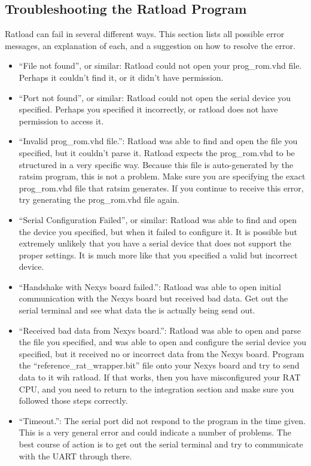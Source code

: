 \documentclass[notitlepage]{article}
\begin{document}
\subsection{Troubleshooting the Ratload Program}
Ratload can fail in several different ways. This section lists all possible error messages, an explanation of each, and a suggestion on how to resolve the error.

\begin{itemize}
\item ``File not found'', or similar: Ratload could not open your prog\_rom.vhd file. Perhaps it couldn't find it, or it didn't have permission.
\item ``Port not found'', or similar: Ratload could not open the serial device you specified. Perhaps you specified it incorrectly, or ratload does not have permission to access it.
\item ``Invalid prog\_rom.vhd file.'': Ratload was able to find and open the file you specified, but it couldn't parse it. Ratload expects the prog\_rom.vhd to be structured in a very specific way. Because this file is auto-generated by the ratsim program, this is not a problem. Make sure you are specifying the exact prog\_rom.vhd file that ratsim generates. If you continue to receive this error, try generating the prog\_rom.vhd file again.
\item ``Serial Configuration Failed'', or similar: Ratload was able to find and open the device you specified, but when it failed to configure it. It is possible but extremely unlikely that you have a serial device that does not support the proper settings. It is much more like that you specified a valid but incorrect device.
\item ``Handshake with Nexys board failed.'': Ratload was able to open initial communication with the Nexys board but received bad data. Get out the serial terminal and see what data the is actually being send out.
\item ``Received bad data from Nexys board.'': Ratload was able to open and parse the file you specified, and was able to open and configure the serial device you specified, but it received no or incorrect data from the Nexys board. Program the ``reference\_rat\_wrapper.bit'' file onto your Nexys board and try to send data to it wih ratload. If that works, then you have misconfigured your RAT CPU, and you need to return to the integration section and make sure you followed those steps correctly. 
\item ``Timeout.'': The serial port did not respond to the program in the time given. This is a very general error and could indicate a number of problems. The best course of action is to get out the serial terminal and try to communicate with the UART through there.
\end{itemize}
\end{document}
